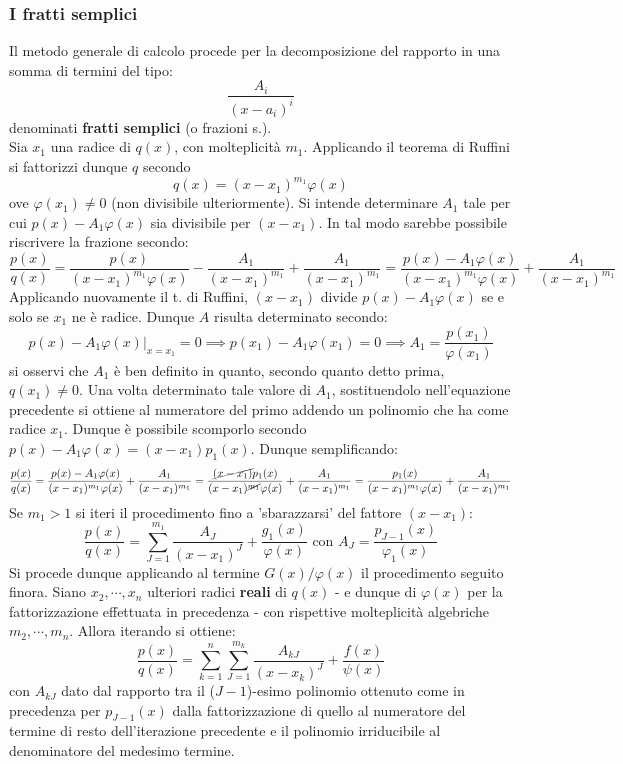 \documentclass[10pt, oneside]{book}
\theoremstyle{plain}
\begin{document}
\subsubsection*{I fratti semplici}
 Il metodo generale di calcolo procede per la decomposizione del rapporto in una somma di termini del tipo:
 \[\frac{A_i}{(x - a_i)^i}\]
denominati \textbf{fratti semplici} (o frazioni s.).
\\Sia $x_1$ una radice di $q(x)$, con molteplicità $m_1$. Applicando il teorema di Ruffini si fattorizzi dunque $q$ secondo
\[q(x) = (x - x_1)^{m_1} \varphi(x)\]
ove $\varphi(x_1) \neq 0$ (non divisibile ulteriormente). Si intende determinare $A_1$ tale per cui $p(x) - A_1\varphi(x)$ sia divisibile per $(x-x_1)$. In tal modo sarebbe possibile riscrivere la frazione secondo:
\[\frac{p(x)}{q(x)} = \frac{p(x)}{(x-x_1)^{m_1}\varphi(x)} - \frac{A_1}{(x-x_1)^{m_1}} + \frac{A_1}{(x-x_1)^{m_1}} = \frac{p(x) - A_1\varphi(x)}{(x-x_1)^{m_1}\varphi(x)} + \frac{A_1}{(x-x_1)^{m_1}}\]
Applicando nuovamente il t. di Ruffini, $(x-x_1)$ divide $p(x) - A_1\varphi(x)$ se e solo se $x_1$ ne è radice. Dunque $A$ risulta determinato secondo:
\[p(x) - A_1\varphi(x)\big|_{x = x_1} = 0 \implies p(x_1) - A_1 \varphi(x_1) = 0 \implies A_1 = \frac{p(x_1)}{\varphi(x_1)}\]
si osservi che $A_1$ è ben definito in quanto, secondo quanto detto prima, $q(x_1) \neq 0$. Una volta determinato tale valore di $A_1$, sostituendolo nell'equazione precedente si ottiene al numeratore del primo addendo un polinomio che ha come radice $x_1$. Dunque è possibile scomporlo secondo $p(x) - A_1\varphi(x) = (x - x_1) p_1(x)$. Dunque semplificando:
\[\frac{p(x)}{q(x)} = \frac{p(x) - A_1\varphi(x)}{(x-x_1)^{m_1}\varphi(x)} + \frac{A_1}{(x-x_1)^{m_1}} = \frac{\cancel{(x - x_1)} p_1(x)}{(x-x_1)^{\cancel{m_1}}\varphi(x)} + \frac{A_1}{(x-x_1)^{m_1}} = \frac{p_1(x)}{(x-x_1)^{m_1}\varphi(x)} + \frac{A_1}{(x - x_1)^{m_1}}\]
Se $m_1 > 1$ si iteri il procedimento fino a 'sbarazzarsi' del fattore $(x-x_1)$:
\[\frac{p(x)}{q(x)} = \sum \limits_{J = 1}^{m_1}\frac{A_J}{(x-x_1)^J} + \frac{g_1(x)}{\varphi(x)} \textrm{ con } A_J = \frac{p_{J - 1}(x)}{\varphi_1(x)}\]
Si procede dunque applicando al termine $G(x)/\varphi(x)$ il procedimento seguito finora. Siano $x_2, \cdots , x_n$ ulteriori radici \textbf{reali} di $q(x)$ - e dunque di $\varphi(x)$ per la fattorizzazione effettuata in precedenza - con rispettive molteplicità algebriche $m_2, \cdots, m_n$. Allora iterando si ottiene:
\[\frac{p(x)}{q(x)} = \sum \limits_{k = 1}^n \sum \limits_{J = 1}^{m_k}\frac{A_{kJ}}{(x-x_k)^J} + \frac{f(x)}{\psi(x)}\]
con $A_{kJ}$ dato dal rapporto tra il ($J-1$)-esimo polinomio ottenuto come in precedenza per $p_{J-1}(x)$ dalla fattorizzazione di quello al numeratore del termine di resto dell'iterazione precedente e il polinomio irriducibile al denominatore del medesimo termine.
\end{document}
